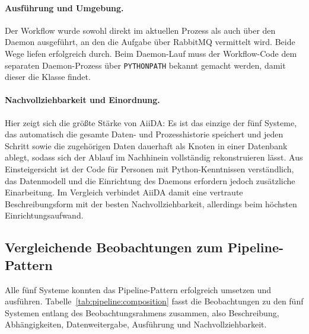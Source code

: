 \paragraph{Ausführung und Umgebung.}
Der Workflow wurde sowohl direkt im aktuellen Prozess als auch über den Daemon ausgeführt, an den
die Aufgabe über RabbitMQ vermittelt wird. Beide Wege liefen erfolgreich durch. Beim Daemon-Lauf
muss der Workflow-Code dem separaten Daemon-Prozess über \texttt{PYTHONPATH} bekannt gemacht werden,
damit dieser die Klasse findet.

\paragraph{Nachvollziehbarkeit und Einordnung.}
Hier zeigt sich die größte Stärke von AiiDA: Es ist das einzige der fünf Systeme, das automatisch
die gesamte Daten- und Prozesshistorie speichert und jeden Schritt sowie die zugehörigen Daten
dauerhaft als Knoten in einer Datenbank ablegt, sodass sich der Ablauf im Nachhinein vollständig
rekonstruieren lässt. Aus Einsteigersicht ist der Code für Personen mit Python-Kenntnissen
verständlich, das Datenmodell und die Einrichtung des Daemons erfordern jedoch zusätzliche
Einarbeitung. Im Vergleich verbindet AiiDA damit eine vertraute Beschreibungsform mit der besten
Nachvollziehbarkeit, allerdings beim höchsten Einrichtungsaufwand.

\subsection{Vergleichende Beobachtungen zum Pipeline-Pattern}
\label{sec:practical:pipeline:comparison}

Alle fünf Systeme konnten das Pipeline-Pattern erfolgreich umsetzen und ausführen.
Tabelle~\ref{tab:pipeline:composition} fasst die Beobachtungen zu den fünf Systemen entlang des
Beobachtungsrahmens zusammen, also Beschreibung, Abhängigkeiten, Datenweitergabe, Ausführung und
Nachvollziehbarkeit.

